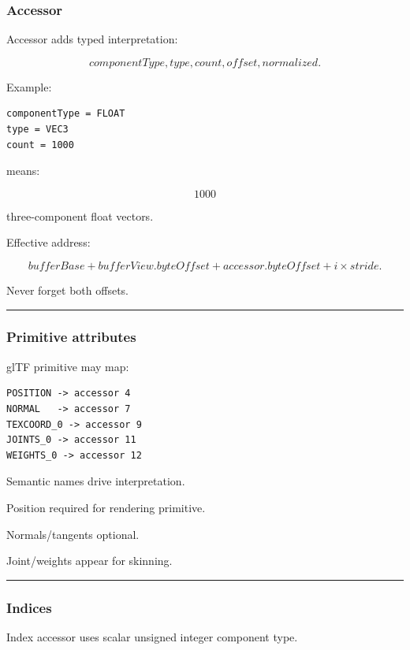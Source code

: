 \subsubsection{Accessor}\label{accessor}

Accessor adds typed interpretation:

\[
componentType,
type,
count,
offset,
normalized.
\]

Example:

\begin{verbatim}
componentType = FLOAT
type = VEC3
count = 1000
\end{verbatim}

means:

\[
1000
\]

three-component float vectors.

Effective address:

\[
\boxed{
bufferBase
+
bufferView.byteOffset
+
accessor.byteOffset
+
i\times stride.
}
\]

Never forget both offsets.

\begin{center}\rule{0.5\linewidth}{0.5pt}\end{center}

\subsubsection{Primitive attributes}\label{primitive-attributes}

glTF primitive may map:

\begin{verbatim}
POSITION -> accessor 4
NORMAL   -> accessor 7
TEXCOORD_0 -> accessor 9
JOINTS_0 -> accessor 11
WEIGHTS_0 -> accessor 12
\end{verbatim}

Semantic names drive interpretation.

Position required for rendering primitive.

Normals/tangents optional.

Joint/weights appear for skinning.

\begin{center}\rule{0.5\linewidth}{0.5pt}\end{center}

\subsubsection{Indices}\label{indices}

Index accessor uses scalar unsigned integer component type.

